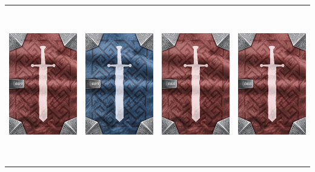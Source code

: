 \documentclass{minimal}
\begin{document}
{\begin{longtable}{llll}
\includegraphics[width=44mm,height=68mm]{./64-151/gh-089b-minor-cure-potion-back.png} &
\includegraphics[width=44mm,height=68mm]{./64-151/gh-089a-minor-cure-potion-back.png} &
\includegraphics[width=44mm,height=68mm]{./64-151/gh-088b-wand-of-darkness-back.png} &
\includegraphics[width=44mm,height=68mm]{./64-151/gh-088b-wand-of-darkness-back.png}\\ 

\end{longtable}}
\end{document}
